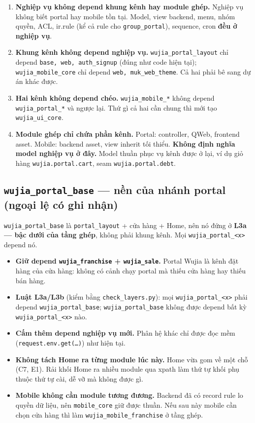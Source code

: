 \begin{enumerate}
\item \textbf{Nghiệp vụ không depend khung kênh hay module ghép.} Nghiệp vụ không biết portal hay
  mobile tồn tại. Model, view backend, menu, nhóm quyền, ACL, ir.rule (kể cả rule cho
  \texttt{group\_portal}), sequence, cron \textbf{đều ở nghiệp vụ}.
\item \textbf{Khung kênh không depend nghiệp vụ.} \texttt{wujia\_portal\_layout} chỉ depend
  \texttt{base, web, auth\_signup} (đúng như code hiện tại); \texttt{wujia\_mobile\_core} chỉ depend
  \texttt{web, muk\_web\_theme}. Cả hai phải bê sang dự án khác được.
\item \textbf{Hai kênh không depend chéo.} \texttt{wujia\_mobile\_*} không depend
  \texttt{wujia\_portal\_*} và ngược lại. Thứ gì cả hai cần chung thì mới tạo \texttt{wujia\_ui\_core}.
\item \textbf{Module ghép chỉ chứa phần kênh.} Portal: controller, QWeb, frontend asset. Mobile:
  backend asset, view inherit tối thiểu. \textbf{Không định nghĩa model nghiệp vụ ở đây.} Model thuần
  phục vụ kênh được ở lại, ví dụ giỏ hàng \texttt{wujia.portal.cart}, seam \texttt{wujia.portal.debt}.
\end{enumerate}

\subsection{\texttt{wujia\_portal\_base} --- nền của nhánh portal (ngoại lệ có ghi nhận)}

\texttt{wujia\_portal\_base} là \texttt{portal\_layout} + cửa hàng + Home, nên nó đứng
ở \textbf{L3a --- bậc dưới của tầng ghép}, không phải khung kênh. Mọi \texttt{wujia\_portal\_<x>} depend nó.

\begin{itemize}
\item \textbf{Giữ depend \texttt{wujia\_franchise} + \texttt{wujia\_sale}.} Portal Wujia là kênh đặt
  hàng của cửa hàng: không có cảnh chạy portal mà thiếu cửa hàng hay thiếu bán hàng.
\item \textbf{Luật L3a/L3b} (kiểm bằng \texttt{check\_layers.py}): mọi \texttt{wujia\_portal\_<x>}
  phải depend \texttt{wujia\_portal\_base}; \texttt{wujia\_portal\_base} không được depend bất kỳ
  \texttt{wujia\_portal\_<x>} nào.
\item \textbf{Cấm thêm depend nghiệp vụ mới.} Phân hệ khác chỉ được đọc mềm (\texttt{request.env.get(\ldots)}) như hiện tại.
\item \textbf{Không tách Home ra từng module lúc này.} Home vừa gom về một chỗ (C7, E1). Rải khối Home
  ra nhiều module qua xpath làm thứ tự khối phụ thuộc thứ tự cài, dễ vỡ mà không được gì.
\item \textbf{Mobile không cần module tương đương.} Backend đã có record rule lo quyền dữ liệu, nên
  \texttt{mobile\_core} giữ được thuần. Nếu sau này mobile cần chọn cửa hàng thì làm
  \texttt{wujia\_mobile\_franchise} ở tầng ghép.
\end{itemize}

